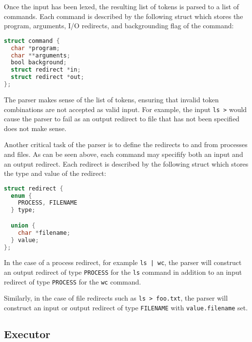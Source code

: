 Once the input has been lexed, the resulting list of tokens is parsed to a list of commands. Each command is described by the following struct which stores the program, arguments, I/O redirects, and backgrounding flag of the command:

\begin{lstlisting}[language=C]
struct command {
  char *program;
  char **arguments;
  bool background;
  struct redirect *in;
  struct redirect *out;
};
\end{lstlisting}

The parser makes sense of the list of tokens, ensuring that invalid token combinations are not accepted as valid input. For example, the input \texttt{ls >} would cause the parser to fail as an output redirect to file that has not been specified does not make sense.

Another critical task of the parser is to define the redirects to and from processes and files. As can be seen above, each command may specifify both an input and an output redirect. Each redirect is described by the following struct which stores the type and value of the redirect:

\begin{lstlisting}[language=C]
struct redirect {
  enum {
    PROCESS, FILENAME
  } type;

  union {
    char *filename;
  } value;
};
\end{lstlisting}

In the case of a process redirect, for example \texttt{ls | wc}, the parser will construct an output redirect of type \texttt{PROCESS} for the \texttt{ls} command in addition to an input redirect of type \texttt{PROCESS} for the \texttt{wc} command.

Similarly, in the case of file redirects such as \texttt{ls > foo.txt}, the parser will construct an input or output redirect of type \texttt{FILENAME} with \texttt{value.filename} set.

\subsection{Executor}
